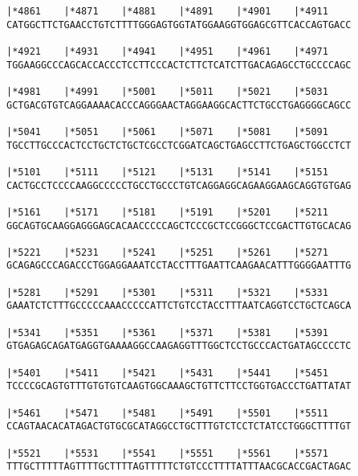 \documentclass{article}
\begin{document}
\begin{Verbatim}
|*4861    |*4871    |*4881    |*4891    |*4901    |*4911    
CATGGCTTCTGAACCTGTCTTTTGGGAGTGGTATGGAAGGTGGAGCGTTCACCAGTGACC
                                                            
|*4921    |*4931    |*4941    |*4951    |*4961    |*4971    
TGGAAGGCCCAGCACCACCCTCCTTCCCACTCTTCTCATCTTGACAGAGCCTGCCCCAGC
                                                            
|*4981    |*4991    |*5001    |*5011    |*5021    |*5031    
GCTGACGTGTCAGGAAAACACCCAGGGAACTAGGAAGGCACTTCTGCCTGAGGGGCAGCC
                                                            
|*5041    |*5051    |*5061    |*5071    |*5081    |*5091    
TGCCTTGCCCACTCCTGCTCTGCTCGCCTCGGATCAGCTGAGCCTTCTGAGCTGGCCTCT
                                                            
|*5101    |*5111    |*5121    |*5131    |*5141    |*5151    
CACTGCCTCCCCAAGGCCCCCTGCCTGCCCTGTCAGGAGGCAGAAGGAAGCAGGTGTGAG
                                                            
|*5161    |*5171    |*5181    |*5191    |*5201    |*5211    
GGCAGTGCAAGGAGGGAGCACAACCCCCAGCTCCCGCTCCGGGCTCCGACTTGTGCACAG
                                                            
|*5221    |*5231    |*5241    |*5251    |*5261    |*5271    
GCAGAGCCCAGACCCTGGAGGAAATCCTACCTTTGAATTCAAGAACATTTGGGGAATTTG
                                                            
|*5281    |*5291    |*5301    |*5311    |*5321    |*5331    
GAAATCTCTTTGCCCCCAAACCCCCATTCTGTCCTACCTTTAATCAGGTCCTGCTCAGCA
                                                            
|*5341    |*5351    |*5361    |*5371    |*5381    |*5391    
GTGAGAGCAGATGAGGTGAAAAGGCCAAGAGGTTTGGCTCCTGCCCACTGATAGCCCCTC
                                                            
|*5401    |*5411    |*5421    |*5431    |*5441    |*5451    
TCCCCGCAGTGTTTGTGTGTCAAGTGGCAAAGCTGTTCTTCCTGGTGACCCTGATTATAT
                                                            
|*5461    |*5471    |*5481    |*5491    |*5501    |*5511    
CCAGTAACACATAGACTGTGCGCATAGGCCTGCTTTGTCTCCTCTATCCTGGGCTTTTGT
                                                            
|*5521    |*5531    |*5541    |*5551    |*5561    |*5571    
TTTGCTTTTTAGTTTTGCTTTTAGTTTTTCTGTCCCTTTTATTTAACGCACCGACTAGAC
                                                            

\end{Verbatim}
\end{document}
